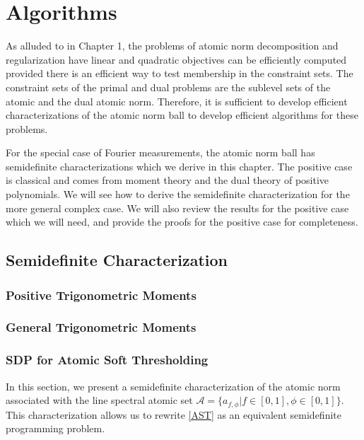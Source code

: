 \chapter{Algorithms}
\label{chap:algos}

As alluded to in Chapter 1, the problems of atomic norm decomposition and
regularization have linear and quadratic objectives can be efficiently computed
provided there is an efficient way to test membership in the constraint sets.
The constraint sets of the primal and dual problems are the sublevel sets of
the atomic and the dual atomic norm. Therefore, it is sufficient to develop
efficient characterizations of the atomic norm ball to develop efficient
algorithms for these problems.

For the special case of Fourier measurements, the atomic norm ball has
semidefinite characterizations which we derive in this chapter. The positive
case is classical and comes from moment theory and the dual theory of positive
polynomials. We will see how to derive the semidefinite characterization for
the more general complex case. We will also review the results for the positive case which we will need, and provide the proofs for the positive case for completeness. 

\section{Semidefinite Characterization}

\subsection{Positive Trigonometric Moments}


\subsection{General Trigonometric Moments}

\subsection{SDP for Atomic Soft Thresholding}
\label{sec:sdp-ast}

In this section, we present a semidefinite characterization of the atomic norm
associated with the line spectral atomic set $\mathcal{A} = \{a_{f,\phi} | f
\in [0, 1], \phi \in [0, 1]\}$. This characterization allows us to rewrite
 {\eqref{AST}} as an equivalent semidefinite programming problem.


